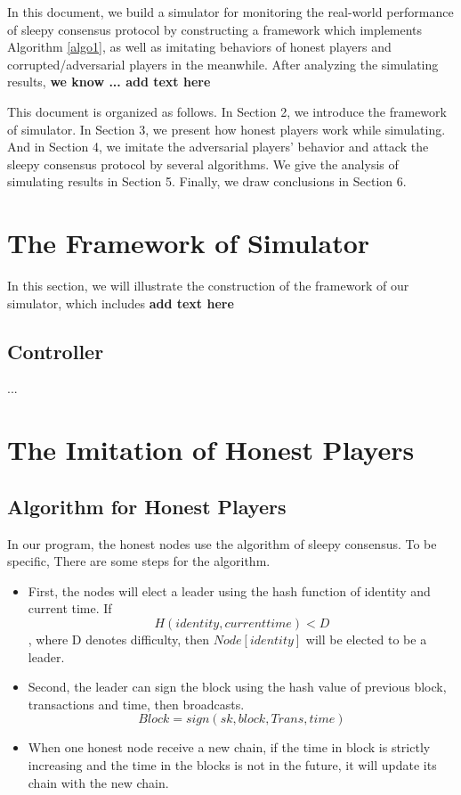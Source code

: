 \documentclass{llncs}
\begin{document}
In this document, we build a simulator for monitoring the real-world performance of sleepy consensus protocol by constructing a framework which implements Algorithm \ref{algo1}, as well as imitating behaviors of honest players and corrupted/adversarial players in the meanwhile. After analyzing the simulating results, \textbf{we know ... add text here}

This document is organized as follows. In Section 2, we introduce the framework of simulator. In Section 3, we present how honest players work while simulating. And in Section 4, we imitate the adversarial players' behavior and attack the sleepy consensus protocol by several algorithms. We give the analysis of simulating results in Section 5. Finally, we draw conclusions in Section 6.

\section{The Framework of Simulator}
%
In this section, we will illustrate the construction of the framework of our simulator, which includes \textbf{add text here}

%
\subsection{Controller}
...

\section{The Imitation of Honest Players}
\subsection{Algorithm for Honest Players}
In our program, the honest nodes use the algorithm of sleepy consensus. To be specific,  	There are some steps for the algorithm.
\begin{itemize}
	\item First, the nodes will elect a leader using the hash function of identity and current time. If
		 $$H(identity, current time) < D$$,
		 where D denotes difficulty, then $Node[identity]$ will be elected to be a leader.\\
	\item Second, the leader can sign the block using the hash value of previous block, transactions and time, then broadcasts.
		 $$Block = sign(sk, block, Trans, time)$$
	\item When one honest node receive a new chain, if the time in block is strictly increasing and the time in the blocks is not in the future, it will update its chain with the new chain.	
\end{itemize}
\end{document}
